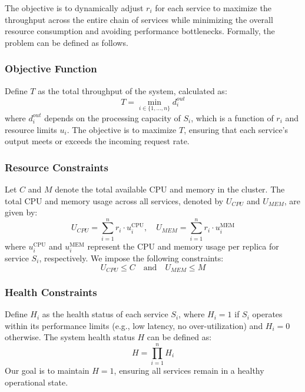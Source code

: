 \documentclass[conference]{IEEEtran}
\begin{document}
The objective is to dynamically adjust $\mathit{r_i}$ for each service to maximize the throughput across the entire chain of services while minimizing the overall resource consumption and avoiding performance bottlenecks. Formally, the problem can be defined as follows.

\subsubsection{Objective Function}

Define $\mathit{T}$ as the total throughput of the system, calculated as:
\begin{equation}
    T = \min_{i \in \{1, \dots, n\}} d_i^{out}
\end{equation}
where $d_i^{out}$ depends on the processing capacity of $S_i$, which is a function of $\mathit{r_i}$ and resource limits $\mathit{u_i}$. The objective is to maximize $T$, ensuring that each service's output meets or exceeds the incoming request rate.

\subsubsection{Resource Constraints}

Let $\mathit{C}$ and $\mathit{M}$ denote the total available CPU and memory in the cluster. The total CPU and memory usage across all services, denoted by $\mathit{U_{CPU}}$ and $\mathit{U_{MEM}}$, are given by:
\begin{equation}
    U_{CPU} = \sum_{i=1}^{n} r_i \cdot u_i^{\text{CPU}}, \quad U_{MEM} = \sum_{i=1}^{n} r_i \cdot u_i^{\text{MEM}}
\end{equation}
where $u_i^{\text{CPU}}$ and $u_i^{\text{MEM}}$ represent the CPU and memory usage per replica for service $S_i$, respectively. We impose the following constraints:
\begin{equation}
    U_{CPU} \leq C \quad \text{and} \quad U_{MEM} \leq M
\end{equation}

\subsubsection{Health Constraints}

Define $\mathit{H_i}$ as the health status of each service $S_i$, where $\mathit{H_i} = 1$ if $S_i$ operates within its performance limits (e.g., low latency, no over-utilization) and $\mathit{H_i} = 0$ otherwise. The system health status $\mathit{H}$ can be defined as:
\begin{equation}
    H = \prod_{i=1}^{n} H_i
\end{equation}
Our goal is to maintain $H = 1$, ensuring all services remain in a healthy operational state.
\end{document}
